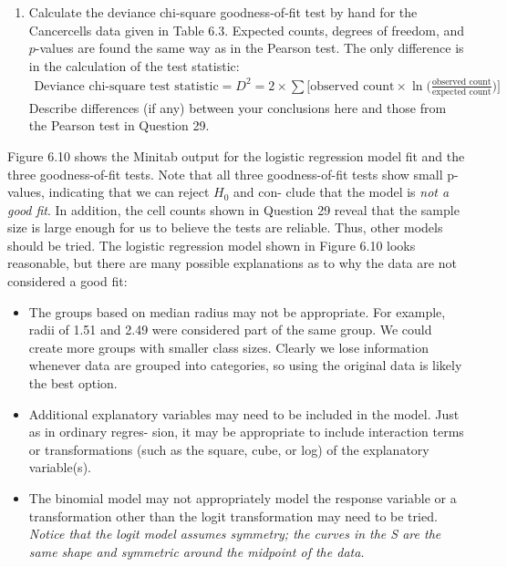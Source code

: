\documentclass[
]{report}
\providecommand{\tightlist}{%
  \setlength{\itemsep}{0pt}\setlength{\parskip}{0pt}}
\begin{document}
\begin{enumerate}
\def\labelenumi{\arabic{enumi}.}
\setcounter{enumi}{29}
\tightlist
\item
  Calculate the deviance chi‐square goodness‐of‐fit test by hand for the Cancercells data given in Table 6.3. Expected counts, degrees of freedom, and \(p\)-values are found the same way as in the Pearson test. The only difference is in the calculation of the test statistic:\\
  \begin{align}
     \text{Deviance chi-square test statistic} = D^2 = 2 \times \sum \biggl[\text{observed count} \times \ln\bigl(\frac{\text{observed count}}{\text{expected count}}\bigr)\biggr]
     \tag{6.26}
     \end{align}
  Describe differences (if any) between your conclusions here and those from the Pearson test in Question 29.
\end{enumerate}

Figure 6.10 shows the Minitab output for the logistic regression model fit and the three goodness-of-fit tests.
Note that all three goodness-of-fit tests show small p-values, indicating that we can reject \(H_0\) and con-
clude that the model is \emph{not a good fit}. In addition, the cell counts shown in Question 29 reveal that the sample
size is large enough for us to believe the tests are reliable. Thus, other models should be tried. The logistic
regression model shown in Figure 6.10 looks reasonable, but there are many possible explanations as to why
the data are not considered a good fit:

\begin{itemize}
\item
  The groups based on median radius may not be appropriate. For example, radii of 1.51 and 2.49 were
  considered part of the same group. We could create more groups with smaller class sizes. Clearly we lose
  information whenever data are grouped into categories, so using the original data is likely the best option.
\item
  Additional explanatory variables may need to be included in the model. Just as in ordinary regres-
  sion, it may be appropriate to include interaction terms or transformations (such as the square, cube,
  or log) of the explanatory variable(s).
\item
  The binomial model may not appropriately model the response variable or a transformation other
  than the logit transformation may need to be tried. \emph{Notice that the logit model assumes symmetry; the curves in the S are the same shape and symmetric around the midpoint of the data.}
\end{itemize}
\end{document}
